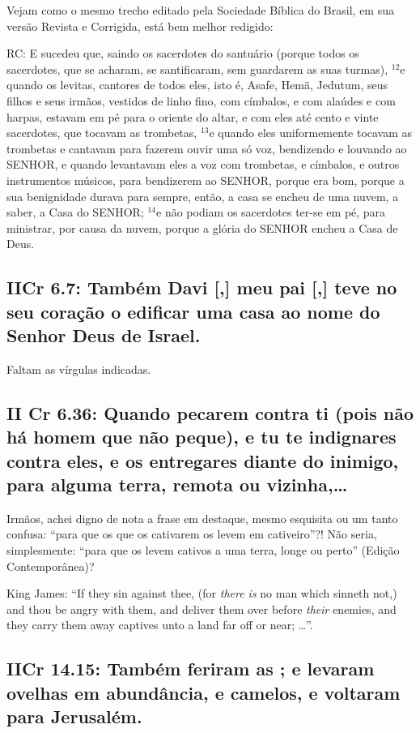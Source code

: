 Vejam como o mesmo trecho editado pela Sociedade Bíblica
do Brasil, em sua versão Revista e Corrigida, está bem melhor redigido:

RC: E sucedeu que, saindo os sacerdotes do santuário (porque todos os
sacerdotes, que se acharam, se santificaram, sem guardarem as suas
turmas), $^{\mathrm{12}}$e quando os levitas, cantores de todos eles,
isto é, Asafe, Hemã, Jedutum, seus filhos e seus irmãos, vestidos de
linho fino, com címbalos, e com alaúdes e com harpas, estavam em pé
para o oriente do altar, e com eles até cento e vinte sacerdotes, que
tocavam as trombetas, $^{\mathrm{13}}$e quando eles uniformemente
tocavam as trombetas e cantavam para fazerem ouvir uma só voz,
bendizendo e louvando ao SENHOR, e quando levantavam eles a voz com
trombetas, e címbalos, e outros instrumentos músicos, para bendizerem
ao SENHOR, porque era bom, porque a sua benignidade durava para
sempre, então, a casa se encheu de uma nuvem, a saber, a Casa do
SENHOR; $^{\mathrm{14}}$e não podiam os sacerdotes ter-se em pé, para
ministrar, por causa da nuvem, porque a glória do SENHOR encheu a Casa
de Deus.

\subsection{IICr 6.7: Também Davi [,] meu pai [,] teve no seu coração o edificar uma casa ao nome do Senhor Deus de Israel.}
Faltam as vírgulas indicadas.

\subsection{II Cr 6.36: Quando pecarem contra ti (pois não há homem que não peque), e tu te indignares contra eles, e os entregares diante do inimigo,  para alguma terra, remota ou vizinha,\ldots}
Irmãos, achei digno de nota a frase em destaque, mesmo esquisita ou um
tanto confusa: ``para que os que os cativarem os levem em
cativeiro''?! Não seria, simplesmente: ``para que os levem cativos a
uma terra, longe ou perto'' (Edição Contemporânea)?

King James: ``If they sin against thee, (for \emph{there is} no man which sinneth not,) and thou be angry with them, and deliver them over before \emph{their} enemies, and they carry them away captives unto a land far off or near; \ldots''.

\subsection{IICr 14.15: Também feriram as ; e levaram ovelhas em abundância, e camelos, e voltaram para Jerusalém.}

